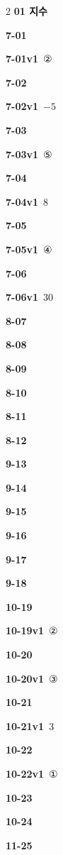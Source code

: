 \documentclass[10pt,a4paper]{article}
\begin{document}
\begin{multicols}{2}\small
\noindent\textbf{01 지수}\par\smallskip
\noindent\textbf{7-01}\ \par
\noindent\textbf{7-01v1}\ ②\par
\noindent\textbf{7-02}\ \par
\noindent\textbf{7-02v1}\ $-5$\par
\noindent\textbf{7-03}\ \par
\noindent\textbf{7-03v1}\ ⑤\par
\noindent\textbf{7-04}\ \par
\noindent\textbf{7-04v1}\ $8$\par
\noindent\textbf{7-05}\ \par
\noindent\textbf{7-05v1}\ ④\par
\noindent\textbf{7-06}\ \par
\noindent\textbf{7-06v1}\ $30$\par
\noindent\textbf{8-07}\ \par
\noindent\textbf{8-08}\ \par
\noindent\textbf{8-09}\ \par
\noindent\textbf{8-10}\ \par
\noindent\textbf{8-11}\ \par
\noindent\textbf{8-12}\ \par
\noindent\textbf{9-13}\ \par
\noindent\textbf{9-14}\ \par
\noindent\textbf{9-15}\ \par
\noindent\textbf{9-16}\ \par
\noindent\textbf{9-17}\ \par
\noindent\textbf{9-18}\ \par
\noindent\textbf{10-19}\ \par
\noindent\textbf{10-19v1}\ ②\par
\noindent\textbf{10-20}\ \par
\noindent\textbf{10-20v1}\ ③\par
\noindent\textbf{10-21}\ \par
\noindent\textbf{10-21v1}\ $3$\par
\noindent\textbf{10-22}\ \par
\noindent\textbf{10-22v1}\ ①\par
\noindent\textbf{10-23}\ \par
\noindent\textbf{10-24}\ \par
\noindent\textbf{11-25}\ \par

\end{multicols}
\end{document}
